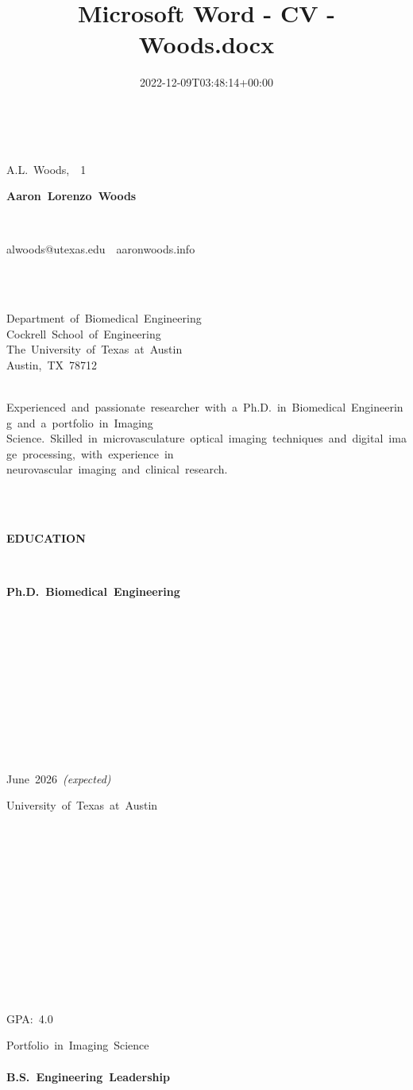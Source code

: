 \documentclass[
]{article}
\title{Microsoft Word - CV - Woods.docx}
\author{}
\date{2022-12-09T03:48:14+00:00}
\begin{document}
\maketitle

\protect{}\label{1}{}

\protect{}\label{page1-div}
~

A.L.~Woods,~~1~

\textbf{Aaron~Lorenzo~Woods~}

\textbf{~}

alwoods@utexas.edu~\textbar~aaronwoods.info

~

~\\
Department~of~Biomedical~Engineering~\\
Cockrell~School~of~Engineering~\\
The~University~of~Texas~at~Austin~\\
Austin,~TX~78712~\\
\strut ~\\
Experienced~and~passionate~researcher~with~a~Ph.D.~in~Biomedical~Engineering~and~a~portfolio~in~Imaging~\\
Science.~Skilled~in~microvasculature~optical~imaging~techniques~and~digital~image~processing,~with~experience~in~\\
neurovascular~imaging~and~clinical~research.~\\
\strut ~\\
\strut ~\\
\textbf{EDUCATION~}

~

\textbf{Ph.D.~Biomedical~Engineering~~}

\textbf{~}

\textbf{~}

\textbf{~}

\textbf{~}

\textbf{~}

\textbf{~}

June~2026~\emph{(expected)~}

University~of~Texas~at~Austin~

~

~

~

~

~

~

~

GPA:~4.0~

Portfolio~in~Imaging~Science~\\
\textbf{~\\
B.S.~Engineering~Leadership~~}~
\end{document}
